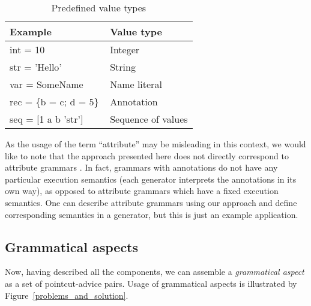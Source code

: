 \documentclass{IOS-Book-Article}     %
\newcommand{\figref}[1]{Figure~\ref{#1}}
\begin{document}
\begin{table}[h!]
\centering
\begin{tabular}{|@{\tt\,\,}l|l|}
	\hline
	\bf Example & \bf Value type \\
	\hline
	int = 10 & Integer \\
	str = 'Hello' & String \\
	var = SomeName & Name literal\\
	rec = \{b = c; d = 5\}\, & Annotation\\
	seq = [1 a b 'str'] \,& Sequence of values \\
	\hline
\end{tabular}
\caption{Predefined value types}\label{value_types}
\end{table}

As the usage of the term ``attribute'' may be misleading in this context, we would like to note that the approach presented here does not directly correspond to attribute grammars \cite{ATG}. In fact, grammars with annotations do not have any particular execution semantics (each generator interprets the annotations in its own way), as opposed to attribute grammars which have a fixed execution semantics. One can describe attribute grammars using our approach and define corresponding semantics in a generator, but this is just an example application.

\subsection{Grammatical aspects}
Now, having described all the components, we can assemble a \emph{grammatical aspect} as a set of pointcut-advice pairs.
Usage of grammatical aspects is illustrated by \figref{problems_and_solution}.
\end{document}
